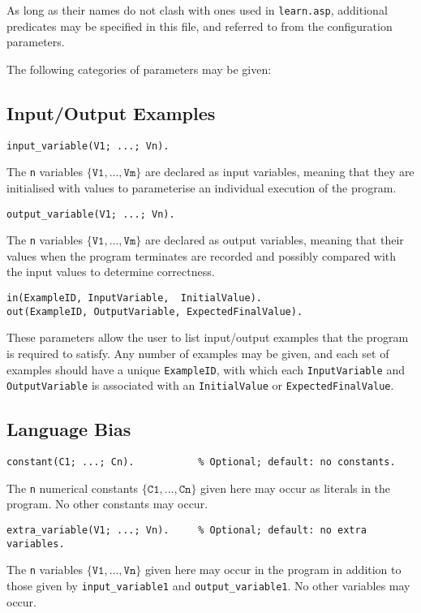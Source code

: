 \documentclass[a4paper,twoside,notitlepage]{report}
\newcommand{\ttt}{\texttt}
\begin{document}
As long as their names do not clash with ones used in \verb|learn.asp|, 
additional predicates may be specified in this file, and referred to from 
the configuration parameters.

The following categories of parameters may be given:

\subsection{Input/Output Examples}

\begin{Verbatim}[samepage=true]
input_variable(V1; ...; Vn).
\end{Verbatim}
The \ttt{n} variables $\{\ttt{V1}, ..., \ttt{Vm}\}$ are declared as input 
variables, meaning that they are initialised with values to parameterise an 
individual execution of the program.

\begin{Verbatim}[samepage=true]
output_variable(V1; ...; Vn).
\end{Verbatim}
The \ttt{n} variables $\{\ttt{V1}, ..., \ttt{Vm}\}$ are declared as output
variables, meaning that their values when the program terminates are recorded
and possibly compared with the input values to determine correctness.

\begin{Verbatim}[samepage=true]
 in(ExampleID, InputVariable,  InitialValue).
out(ExampleID, OutputVariable, ExpectedFinalValue).
\end{Verbatim}
These parameters allow the user to list input/output examples that the program 
is required to satisfy. Any number of examples may be given, and each set of 
examples should have a unique \ttt{ExampleID}, with which each 
\ttt{InputVariable} and \ttt{OutputVariable} is associated with an 
\ttt{InitialValue} or \ttt{ExpectedFinalValue}.

\subsection{Language Bias} \label{sec:synexm_spclng_bias}
\begin{Verbatim}[samepage=true]
constant(C1; ...; Cn).           % Optional; default: no constants.
\end{Verbatim}
The \ttt{n} numerical constants $\{\ttt{C1}, ..., \ttt{Cn}\}$ 
given here may occur as literals in the program. No other constants may occur.

\begin{Verbatim}[samepage=true]
extra_variable(V1; ...; Vn).     % Optional; default: no extra variables.
\end{Verbatim}
The \texttt{n} variables $\{\ttt{V1}, ..., \ttt{Vn}\}$ given here 
may occur in the program in addition to those given by \ttt{input\_variable\/1}
and \ttt{output\_variable\/1}. No other variables may occur.
\end{document}
